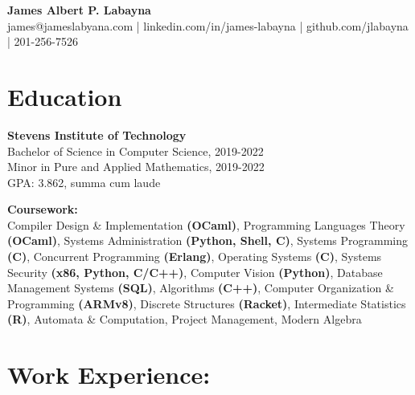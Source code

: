 \documentclass[10pt,letterpaper]{article}
\begin{document}
  \begin{center}
    \textbf{James Albert P. Labayna} \\
    \small james@jameslabyana.com | linkedin.com/in/james-labayna | github.com/jlabayna | 201-256-7526
  \end{center}
  
  \iffalse
  \begin{minipage}[t]{2in}
    \textbf{Present Address:} \\
    205 Hudson St, Apt. 602 \\
    Hoboken, NJ 07030 \\
    201.256.7526
  \end{minipage}
  \hfill
  \begin{minipage}[t]{2.4in}
    \textbf{Permanent Address:} \\
    294 S. Washington Ave., Apt. 87 \\
    Bergenfield, NJ 07030
  \end{minipage}
  \fi
  
  \section{Education}
    \textbf{Stevens Institute of Technology} \\
    Bachelor of Science in Computer Science, 2019-2022 \\
    Minor in Pure and Applied Mathematics, 2019-2022 \\
    GPA: 3.862, summa cum laude
    
    \noindent\textbf{Coursework:}\\
    Compiler Design \& Implementation \textbf{(OCaml)},
    Programming Languages Theory \textbf{(OCaml)},
    Systems Administration \textbf{(Python, Shell, C)},
    Systems Programming \textbf{(C)},
    Concurrent Programming \textbf{(Erlang)},
    Operating Systems \textbf{(C)},
    Systems Security \textbf{(x86, Python, C/C++)},
    Computer Vision \textbf{(Python)},
    Database Management Systems \textbf{(SQL)},
    Algorithms \textbf{(C++)},
    Computer Organization \& Programming \textbf{(ARMv8)},
    Discrete Structures \textbf{(Racket)},
    Intermediate Statistics \textbf{(R)},
    Automata \& Computation,
    Project Management,
    Modern Algebra
   
  \section{Work Experience:}
	
\end{document}
